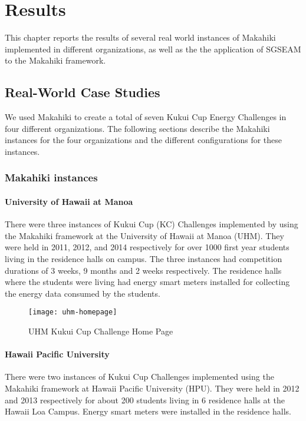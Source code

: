 \chapter{Results}
\label{cha:results}

This chapter reports the results of several real world instances of Makahiki implemented in different organizations, as well as the the application of SGSEAM to the Makahiki framework.

\section{Real-World Case Studies}

We used Makahiki to create a total of seven Kukui Cup Energy Challenges in four different organizations. The following sections describe the Makahiki instances for the four organizations and the different configurations for these instances.

\subsection{Makahiki instances}

\subsubsection{University of Hawaii at Manoa}

There were three instances of Kukui Cup (KC) Challenges implemented by using the Makahiki framework at the University of Hawaii at Manoa (UHM). They were held in 2011, 2012, and 2014 respectively for over 1000 first year students living in the residence halls on campus. The three instances had competition durations of 3 weeks, 9 months and 2 weeks respectively. The residence halls where the students were living had energy smart meters installed for collecting the energy data consumed by the students. 

\begin{figure}[ht!]
   \centering
   \texttt{[image: uhm-homepage]}
   \caption{UHM Kukui Cup Challenge Home Page}
   \label{fig:uhm-homepage}
\end{figure}

\subsubsection{Hawaii Pacific University}

There were two instances of Kukui Cup Challenges implemented using the Makahiki framework at Hawaii Pacific University (HPU). They were held in 2012 and 2013 respectively for about 200 students living in 6 residence halls at the Hawaii Loa Campus. Energy smart meters were installed in the residence halls.

